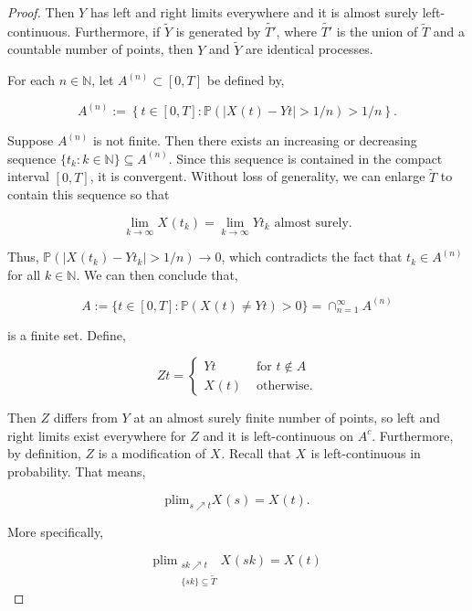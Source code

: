 \documentclass[12pt]{article}
\newcommand{\mb}{\mathbb}
\newcommand{\ra}{\rightarrow}
\newcommand{\te}{\text}
\newcommand{\ind}{\hspace{24pt}}
\newcommand{\pr}{\mb{P}}							%
\newcommand{\T}{T}								%
\renewcommand{\t}{t}							%
\renewcommand{\tt}{s}							%
\newcommand{\X}{X}								%
\newcommand{\cind}[1]{_{#1}}					%
\newcommand{\tp}[1]{(#1)}						%
\newcommand{\tip}[1]{#1}						%
\newcommand{\sln}[1]{^{(#1)}}						%
\newcommand{\alt}[1]{\widetilde{#1}}			%
\newcommand{\indx}[1]{_{#1}}					%
\newcommand{\XX}{Y}								%
\newcommand{\XXX}{Z}							%
\renewcommand{\it}{k}							%
\newcommand{\Tset}{\alt{T}}						%
\newcommand{\typset}{A}							%
\begin{document}
\begin{proof}
Then \(\XX{}{}\) has left and right limits everywhere and it is almost surely left-continuous. Furthermore, if \(\alt{\XX{}{}}\) is generated by \(\alt{T'}\), where \(\alt{T'}\) is the union of \(\Tset\) and a countable number of points, then \(\XX{}{}\) and \(\alt{\XX{}{}}\) are identical processes. 

\ind For each \(n \in \mb{N}\), let \(\typset\sln{n} \subset [0,\T]\) be defined by,

\[\typset\sln{n} := \left\{\t\in [0,\T]: \pr\left(|\X\cind{}\tp{\t} - \XX{}{\t}| > 1/n\right) > 1/n\right\}.\] 

Suppose \(\typset\sln{n}\) is not finite. Then there exists an increasing or decreasing sequence \(\{\t\indx{\it}:\it\in \mb{N}\}\subseteq \typset\sln{n}\). Since this sequence is contained in the compact interval \([0,\T]\), it is convergent. Without loss of generality, we can enlarge \(\Tset\) to contain this sequence so that

\[\lim_{\it \ra\infty} \X\cind{}\tp{\t\indx{\it}} = \lim_{\it\ra\infty} \XX{}{\t\indx{\it}} \te{ almost surely.}\]

Thus, \(\pr(|\X\cind{}\tp{\t\indx{\it}} - \XX{}{\t\indx{\it}}| > 1/n) \ra 0\), which contradicts the fact that \(\t\indx{\it} \in \typset\sln{n}\) for all \(\it\in\mb{N}\). We can then conclude that,

\[\typset:= \{\t\in [0,\T]: \pr(\X\cind{}\tp{\t} \neq \XX{}{\t}) > 0\} = \cap_{n = 1}^\infty \typset\sln{n}\]

is a finite set. Define,

\[\XXX{}{\t}= \begin{cases}
\XX{}{\t} &\te{ for } \t \notin \typset\\
\X\cind{}\tp{\t} &\te{ otherwise.}
\end{cases}\]

Then \(\XXX{}{}\) differs from \(\XX{}{}\) at an almost surely finite number of points, so left and right limits exist everywhere for \(\XXX{}{}\) and it is left-continuous on \(\typset^c\). Furthermore, by definition, \(\XXX{}{}\) is a modification of \(\X\cind{}\tip{}\). Recall that \(\X\cind{}\tip{}\) is left-continuous in probability. That means,

\[\te{plim}_{\tt\nearrow \t} \X\cind{}\tp{\tt} = \X\cind{}\tp{\t}.\]

More specifically,

\[\te{plim}_{\substack{\tt{\it}\nearrow \t\\\{\tt{\it}\} \subseteq \Tset}} \X\cind{}\tp{\tt{\it}} = \X\cind{}\tp{\t}\]


\end{proof}
\end{document}
